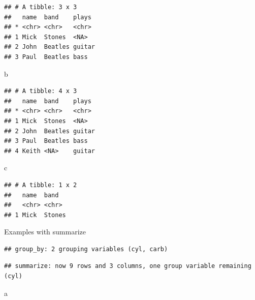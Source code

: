 \documentclass[
]{book}
\newenvironment{Shaded}{\begin{snugshade}}{\end{snugshade}}
\newcommand{\DataTypeTok}[1]{\textcolor[rgb]{0.13,0.29,0.53}{#1}}
\newcommand{\KeywordTok}[1]{\textcolor[rgb]{0.13,0.29,0.53}{\textbf{#1}}}
\newcommand{\NormalTok}[1]{#1}
\newcommand{\OperatorTok}[1]{\textcolor[rgb]{0.81,0.36,0.00}{\textbf{#1}}}
\newcommand{\StringTok}[1]{\textcolor[rgb]{0.31,0.60,0.02}{#1}}
\begin{document}
\begin{verbatim}
## # A tibble: 3 x 3
##   name  band    plays 
## * <chr> <chr>   <chr> 
## 1 Mick  Stones  <NA>  
## 2 John  Beatles guitar
## 3 Paul  Beatles bass
\end{verbatim}

\begin{Shaded}
\begin{Highlighting}[]
\NormalTok{b}
\end{Highlighting}
\end{Shaded}

\begin{verbatim}
## # A tibble: 4 x 3
##   name  band    plays 
## * <chr> <chr>   <chr> 
## 1 Mick  Stones  <NA>  
## 2 John  Beatles guitar
## 3 Paul  Beatles bass  
## 4 Keith <NA>    guitar
\end{verbatim}

\begin{Shaded}
\begin{Highlighting}[]
\NormalTok{c}
\end{Highlighting}
\end{Shaded}

\begin{verbatim}
## # A tibble: 1 x 2
##   name  band  
##   <chr> <chr> 
## 1 Mick  Stones
\end{verbatim}

Examples with summarize

\begin{Shaded}
\end{Shaded}

\begin{verbatim}
## group_by: 2 grouping variables (cyl, carb)
\end{verbatim}

\begin{verbatim}
## summarize: now 9 rows and 3 columns, one group variable remaining (cyl)
\end{verbatim}

\begin{Shaded}
\begin{Highlighting}[]
\NormalTok{a}
\end{Highlighting}
\end{Shaded}
\end{document}
